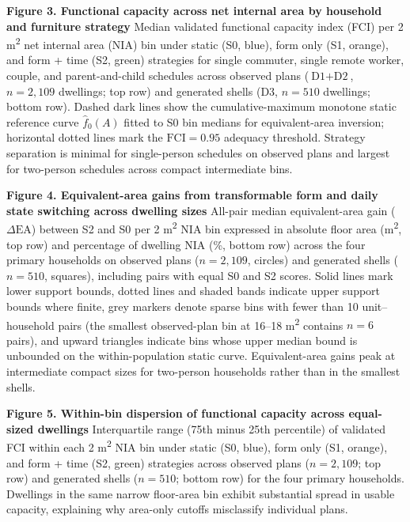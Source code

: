 \documentclass[12pt,letterpaper]{article}
\begin{document}
\textbf{Figure 3. Functional capacity across net internal area by household and furniture strategy} Median validated functional capacity index (FCI) per 2 m\textsuperscript{2} net internal area (NIA) bin under static (S0, blue), form only (S1, orange), and form + time (S2, green) strategies for single commuter, single remote worker, couple, and parent-and-child schedules across observed plans (\(\text{D1} + \text{D2}\), \(n = 2,109\) dwellings; top row) and generated shells (\(\text{D3}\), \(n = 510\) dwellings; bottom row). Dashed dark lines show the cumulative-maximum monotone static reference curve \(\hat{f}_0(A)\) fitted to S0 bin medians for equivalent-area inversion; horizontal dotted lines mark the \(\text{FCI} = 0.95\) adequacy threshold. Strategy separation is minimal for single-person schedules on observed plans and largest for two-person schedules across compact intermediate bins.

\textbf{Figure 4. Equivalent-area gains from transformable form and daily state switching across dwelling sizes} All-pair median equivalent-area gain (\(\Delta\text{EA}\)) between S2 and S0 per 2 m\textsuperscript{2} NIA bin expressed in absolute floor area (m\textsuperscript{2}, top row) and percentage of dwelling NIA (\%, bottom row) across the four primary households on observed plans (\(n = 2,109\), circles) and generated shells (\(n = 510\), squares), including pairs with equal S0 and S2 scores. Solid lines mark lower support bounds, dotted lines and shaded bands indicate upper support bounds where finite, grey markers denote sparse bins with fewer than 10 unit--household pairs (the smallest observed-plan bin at 16--18 m\textsuperscript{2} contains \(n = 6\) pairs), and upward triangles indicate bins whose upper median bound is unbounded on the within-population static curve. Equivalent-area gains peak at intermediate compact sizes for two-person households rather than in the smallest shells.

\textbf{Figure 5. Within-bin dispersion of functional capacity across equal-sized dwellings} Interquartile range (75th minus 25th percentile) of validated FCI within each 2 m\textsuperscript{2} NIA bin under static (S0, blue), form only (S1, orange), and form + time (S2, green) strategies across observed plans (\(n = 2,109\); top row) and generated shells (\(n = 510\); bottom row) for the four primary households. Dwellings in the same narrow floor-area bin exhibit substantial spread in usable capacity, explaining why area-only cutoffs misclassify individual plans.
\end{document}
